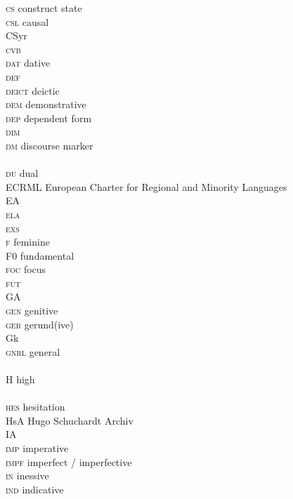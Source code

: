 \begin{refsection}
\begin{multicols}{2}
\begin{tabbing}
\textsc{cs} \> construct state \\
\textsc{csl} \> causal \\
CSyr \>   \\
\textsc{cvb} \>  \\
\textsc{dat} \> dative \\
\textsc{def} \>  \\
\textsc{deict} \> deictic \\
\textsc{dem} \> demonstrative \\
\textsc{dep} \> dependent form \\
\textsc{dim} \>  \\
\textsc{dm} \> discourse marker \\
 \>  \\
\textsc{du} \> dual \\
ECRML \> European Charter for Regional and Minority Languages \\
EA \>   \\
\textsc{ela} \>  \\
\textsc{exs} \>  \\
\textsc{f} \> feminine \\
F0 \> fundamental  \\
\textsc{foc} \> focus \\
\textsc{fut} \>  \\
GA \>   \\
\textsc{gen} \> genitive \\
\textsc{ger} \> gerund(ive) \\
Gk         \>  \\
\textsc{gnrl} \> general \\
          \>  \\
H \> high  \\
          \>   \\
\textsc{hes} \> hesitation \\
HsA \> Hugo Schuchardt Archiv \\
IA \>   \\
\textsc{imp} \> imperative \\
\textsc{impf} \> imperfect / imperfective \\
\textsc{in} \> inessive \\
\textsc{ind} \> indicative \\

\end{tabbing}
\end{multicols}
\end{refsection}
